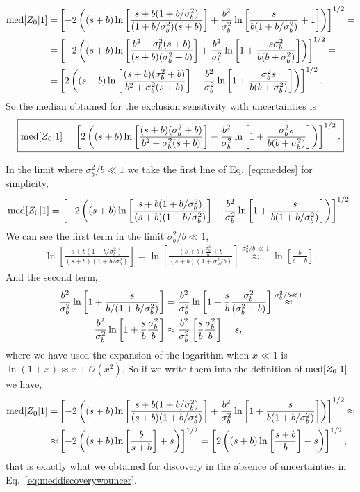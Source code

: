 \documentclass[12pt,a4paper]{article}
\newcommand{\approxtext}[1]{\ensuremath{\stackrel{#1}{\approx}}}
\begin{document}
\begin{align}
{\rm med}[Z_0|1]=&\left[-2\left((s+b)\ln\left[\frac{s+b(1+b/\sigma_b^2)}{(1+b/\sigma_b^2)(s+b)}\right]+\frac{b^2}{\sigma_b^2}\ln\left[\frac{s}{b(1+b/\sigma_b^2)}+1\right]\right)\right]^{1/2}=\notag\\
=&\left[-2\left((s+b)\ln\left[\frac{b^2+\sigma_b^2(s+b)}{(s+b)(\sigma_b^2+b)}\right]+\frac{b^2}{\sigma_b^2}\ln\left[1+\frac{s\sigma_b^2}{b(b+\sigma_b^2)}\right]\right)\right]^{1/2}=\notag\\
=&\left[
2\left((s+b)\ln\left[\frac{(s+b)(\sigma_b^2+b)}{b^2+\sigma_b^2(s+b)}\right]-\frac{b^2}{\sigma_b^2}\ln\left[1+\frac{\sigma_b^2s}{b(b+\sigma_b^2)}\right]\right)
\right]^{1/2}.
\label{eq:meddes}
\end{align}
So the median obtained for the exclusion sensitivity with uncertainties is
\begin{align}
\boxed{{\rm med}[Z_0|1]=\left[
2\left((s+b)\ln\left[\frac{(s+b)(\sigma_b^2+b)}{b^2+\sigma_b^2(s+b)}\right]-\frac{b^2}{\sigma_b^2}\ln\left[1+\frac{\sigma_b^2s}{b(b+\sigma_b^2)}\right]\right)
\right]^{1/2}.}
\label{eq:medz0wunc}
\end{align}

In the limit where $\sigma_b^2/b\ll 1$ we take the first line of Eq.~\eqref{eq:meddes} for simplicity,
\begin{align}
{\rm med}[Z_0|1]=\left[
-2\left((s+b)\ln\left[\frac{s+b(1+b/\sigma_b^2)}{(s+b)(1+b/\sigma_b^2)}\right]+\frac{b^2}{\sigma_b^2}\ln\left[1+\frac{s}{b(1+b/\sigma_b^2)}\right]\right)
\right]^{1/2}.
\end{align}
We can see the first term in the limit $\sigma_b^2/b\ll 1$,
\begin{align}
\ln\left[\frac{s+b(1+b/\sigma_b^2)}{(s+b)(1+b/\sigma_b^2)}\right]=\ln\left[\frac{(s+b)\frac{\sigma_b^2}{b} + b}{(s+b)(1+\sigma_b^2/b)}\right]\approxtext{\sigma_b^2/b\ll 1}\ln\left[\frac{b}{s+b}\right].
\end{align}
And the second term,
\begin{align}
\frac{b^2}{\sigma_b^2}\ln\left[1+\frac{s}{b/(1+b/\sigma_b^2)}\right]&=\frac{b^2}{\sigma_b^2}\ln\left[1+\frac{s}{b}\frac{\sigma_b^2}{(\sigma_b^2+b)}\right]\approxtext{\sigma_b^2/b\ll 1} \notag\\ \frac{b^2}{\sigma_b^2}\ln\left[1+\frac{s}{b}\frac{\sigma_b^2}{b}\right]
&\approx \frac{b^2}{\sigma_b^2}\left[\frac{s}{b}\frac{\sigma_b^2}{b}\right]=s,
\end{align}
where we have used the expansion of the logarithm when $x\ll 1$ is $\ln(1+x)\approx x+\mathcal{O}(x^2)$. So if we write them into the definition of ${\rm med}[Z_0|1]$ we have,
\begin{align}
{\rm med}[Z_0|1]=&\left[
-2\left((s+b)\ln\left[\frac{s+b(1+b/\sigma_b^2)}{(s+b)(1+b/\sigma_b^2)}\right]+\frac{b^2}{\sigma_b^2}\ln\left[1+\frac{s}{b(1+b/\sigma_b^2)}\right]\right)
\right]^{1/2}\approx \notag\\
\approx &\left[-2\left((s+b)\ln\left[\frac{b}{s+b}\right]+s\right)\right]^{1/2}=\left[2\left((s+b)\ln\left[\frac{s+b}{b}\right]-s\right)\right]^{1/2},
\end{align}
that is exactly what we obtained for discovery in the absence of uncertainties in Eq.~\eqref{eq:meddiscoverywouncer}.
\end{document}

